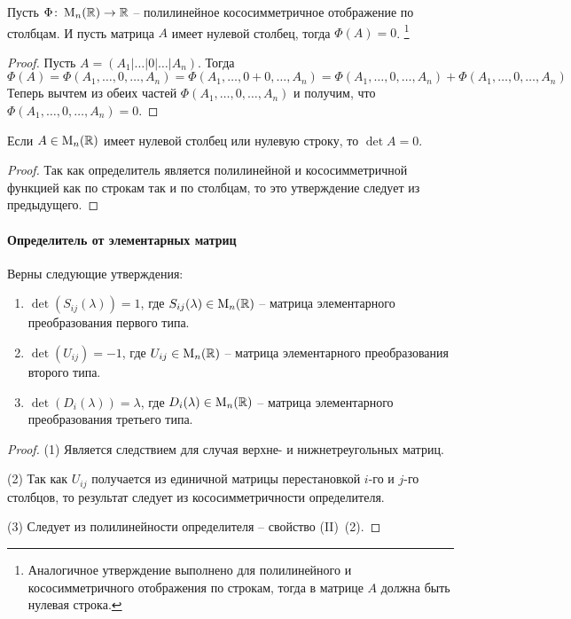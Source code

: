 \begin{claim}
\label{claim::PolyLinearZero}
Пусть $\Phi\colon \operatorname{M}_{n}(\mathbb R)\to \mathbb R$ -- полилинейное кососимметричное отображение по столбцам.
И пусть матрица $A$ имеет нулевой столбец, тогда $\Phi(A) = 0$.%
\footnote{Аналогичное утверждение выполнено для полилинейного и кососимметричного отображения по строкам, тогда в матрице $A$ должна быть нулевая строка.}
\end{claim}
\begin{proof}
Пусть $A = (A_1|\ldots|0|\ldots|A_n)$.
Тогда
\[
\Phi(A) = \Phi(A_1,\ldots, 0, \ldots, A_n) = \Phi(A_1,\ldots, 0 + 0, \ldots, A_n) = \Phi(A_1,\ldots, 0, \ldots, A_n) +\Phi(A_1,\ldots, 0, \ldots, A_n) 
\]
Теперь вычтем из обеих частей $\Phi(A_1,\ldots, 0, \ldots, A_n)$ и получим, что $\Phi(A_1,\ldots, 0, \ldots, A_n) =  0$.
\end{proof}

\begin{claim}
\label{claim::DetZero}
Если $A\in\operatorname{M}_{n}(\mathbb R)$ имеет нулевой столбец или нулевую строку, то $\det A = 0$.
\end{claim}
\begin{proof}
Так как определитель является полилинейной и кососимметричной функцией как по строкам так и по столбцам, то это утверждение следует из предыдущего.
\end{proof}


\paragraph{Определитель от элементарных матриц}

\begin{claim}
Верны следующие утверждения:
\begin{enumerate}
\item $\det (S_{ij}(\lambda)) = 1$, где $S_{ij}(\lambda)\in\operatorname{M}_{n}(\mathbb R)$ -- матрица элементарного преобразования первого типа.

\item $\det (U_{ij}) = -1$, где $U_{ij}\in\operatorname{M}_{n}(\mathbb R)$ -- матрица элементарного преобразования второго типа.

\item $\det(D_i(\lambda)) = \lambda$, где $D_{i}(\lambda)\in\operatorname{M}_{n}(\mathbb R)$ -- матрица элементарного преобразования третьего типа.
\end{enumerate}
\end{claim}
\begin{proof}
(1) Является следствием для случая верхне- и нижнетреугольных матриц.

(2) Так как $U_{ij}$ получается из единичной матрицы перестановкой $i$-го и $j$-го столбцов, то результат следует из кососимметричности определителя.

(3) Следует из полилинейности определителя -- свойство (II)~(2).
\end{proof}



